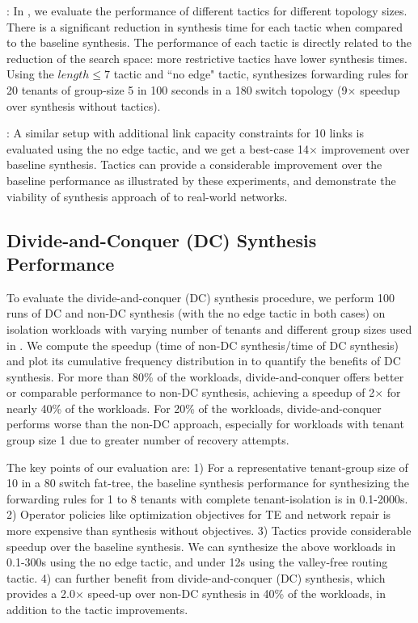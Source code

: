 : 
In ,
 we evaluate the performance of different tactics for different topology sizes. There is a
 significant reduction in synthesis time for each tactic when compared to the baseline synthesis.
 The performance of each tactic is directly related to the reduction of the search space: more
 restrictive tactics have lower synthesis times. 
  Using the $length \leq 7$ tactic and ``no edge" tactic, \Name synthesizes forwarding rules for 20 tenants of group-size 5 in 100 seconds in a 180 switch
 topology (9$\times$ speedup over synthesis without tactics).
  
 : A similar setup
 with additional link capacity constraints for 10 links is evaluated
 using the no edge tactic, and we get a best-case 14$\times$
 improvement over baseline synthesis. 
 Tactics can provide a considerable improvement
 over the baseline performance as illustrated by these experiments,
 and demonstrate the viability of synthesis approach of \Name to
 real-world networks.
 
\subsection{Divide-and-Conquer (DC) Synthesis Performance} \label{sec:optimisticeval} 
To evaluate the divide-and-conquer (DC) synthesis procedure, we
perform 100 runs of DC and non-DC synthesis 
(with the no edge tactic in both cases) on isolation
workloads with varying number of tenants and different group sizes
used in . We compute the
speedup (time of non-DC synthesis/time of DC synthesis) and plot its
cumulative frequency distribution in  to quantify
the benefits of DC synthesis. For more than 80\% of the
workloads, divide-and-conquer offers better or comparable
performance to non-DC synthesis, achieving a speedup of
2$\times$ for nearly 40\% of the workloads. For 20\% of the workloads,
divide-and-conquer performs worse than the non-DC approach,
especially for workloads with tenant group size 1 due to
greater number of recovery attempts. 


 The key points of our evaluation are:
1) For a representative tenant-group size of 10 in a 80 switch
  fat-tree, the baseline synthesis performance for synthesizing the
  forwarding rules for 1 to 8 tenants with complete tenant-isolation
  is in 0.1-2000s.
2) Operator policies like optimization objectives for TE and  
   network repair is more expensive than synthesis without
   objectives.
3) Tactics provide considerable speedup over the
        baseline synthesis.  We can
        synthesize the above workloads in 0.1-300s using the no edge
        tactic, and under 12s using the valley-free routing tactic.
4) \Name can further benefit from 
        divide-and-conquer (DC) synthesis, which provides a 2.0$\times$ speed-up
        over non-DC synthesis in 40\% of the workloads, in
        addition to the tactic improvements.
 